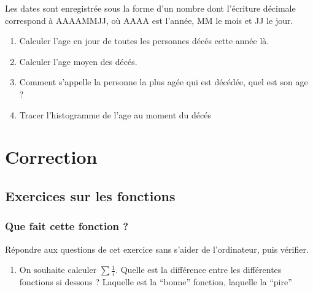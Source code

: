 \documentclass[letterpaper,10pt,english]{sphinxhowto}
\begin{document}
\sphinxAtStartPar
Les dates sont enregistrée sous la forme d’un nombre dont l’écriture décimale correspond à AAAAMMJJ, où AAAA est l’année, MM le mois et JJ le jour.
\begin{enumerate}
%
\setcounter{enumi}{15}
\item {} 
\sphinxAtStartPar
Calculer l’age en jour de toutes les personnes décés cette année là.

\item {} 
\sphinxAtStartPar
Calculer l’age moyen des décés.

\item {} 
\sphinxAtStartPar
Comment s’appelle la personne la plus agée qui est décédée, quel est son age ?

\item {} 
\sphinxAtStartPar
Tracer l’histogramme de l’age au moment du décés

\end{enumerate}

\sphinxAtStartPar
{}


\section{Correction}
\label{\detokenize{correction:correction}}\label{\detokenize{correction::doc}}

\subsection{Exercices sur les fonctions}
\label{\detokenize{cours1_fonctions_corr_exercices:exercices-sur-les-fonctions}}\label{\detokenize{cours1_fonctions_corr_exercices::doc}}

\subsubsection{Que fait cette fonction ?}
\label{\detokenize{cours1_fonctions_corr_exercices:que-fait-cette-fonction}}
\sphinxAtStartPar
Répondre aux questions de cet exercice sans s’aider de l’ordinateur, puis vérifier.
\begin{enumerate}
%
\item {} 
\sphinxAtStartPar
On souhaite calculer \(\sum \frac{1}{i}\). Quelle est la différence entre les différentes fonctions si dessous ? Laquelle est la “bonne” fonction, laquelle la “pire”

\end{enumerate}
\end{document}
